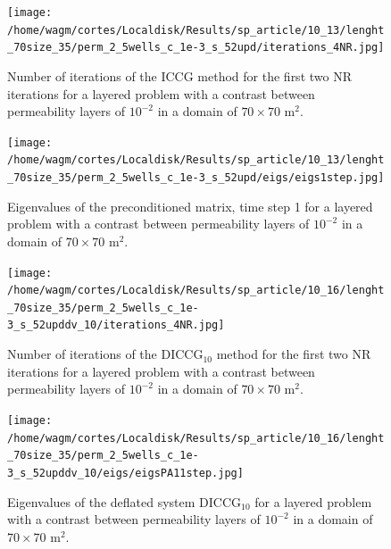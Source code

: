 \documentclass[12pt]{article}
\begin{document}
\begin{figure}[!h]
\centering
\begin{minipage}{.4\textwidth}
\vspace{-0.9cm}
\hspace{-1cm}
\texttt{[image: /home/wagm/cortes/Localdisk/Results/sp\_article/10\_13/lenght\_70size\_35/perm\_2\_5wells\_c\_1e-3\_s\_52upd/iterations\_4NR.jpg]}
\vspace{-1.3cm}
\caption{Number of iterations of the ICCG method for the first two NR iterations for a layered problem with a contrast between permeability layers of $10^{-2}$ in a domain of $70 \times 70$ m$^2$.}
\label{fig:NR_IC_2}
\end{minipage}%
\hspace{15mm}
\begin{minipage}{.4\textwidth}
 \centering
 \vspace{-5mm}
\texttt{[image: /home/wagm/cortes/Localdisk/Results/sp\_article/10\_13/lenght\_70size\_35/perm\_2\_5wells\_c\_1e-3\_s\_52upd/eigs/eigs1step.jpg]}
\caption{Eigenvalues of the preconditioned matrix, time step 1 for a layered problem with a contrast between permeability layers of $10^{-2}$ in a domain of $70 \times 70$ m$^2$.}
\label{fig:eigs_MA_2}
\end{minipage}
\end{figure}


\begin{figure}[!h]
\centering
\begin{minipage}{.4\textwidth}
\vspace{-0.4cm}
\hspace{-1cm}
\texttt{[image: /home/wagm/cortes/Localdisk/Results/sp\_article/10\_16/lenght\_70size\_35/perm\_2\_5wells\_c\_1e-3\_s\_52upddv\_10/iterations\_4NR.jpg]}
\vspace{-1.3cm}
\caption{Number of iterations of the DICCG$_{10}$ method for the first two NR iterations for a layered problem with a contrast between permeability layers of $10^{-2}$ in a domain of $70 \times 70$ m$^2$.}
\label{fig:NR_D10_2}
\end{minipage}%
\hspace{15mm}
\begin{minipage}{.4\textwidth}
 \centering
\texttt{[image: /home/wagm/cortes/Localdisk/Results/sp\_article/10\_16/lenght\_70size\_35/perm\_2\_5wells\_c\_1e-3\_s\_52upddv\_10/eigs/eigsPA11step.jpg]}
\caption{Eigenvalues of the deflated system DICCG$_{10}$ for a layered problem with a contrast between permeability layers of $10^{-2}$ in a domain of $70 \times 70$ m$^2$.}
\label{fig:eigs_PA10_2}
\end{minipage}
\end{figure}
\end{document}
